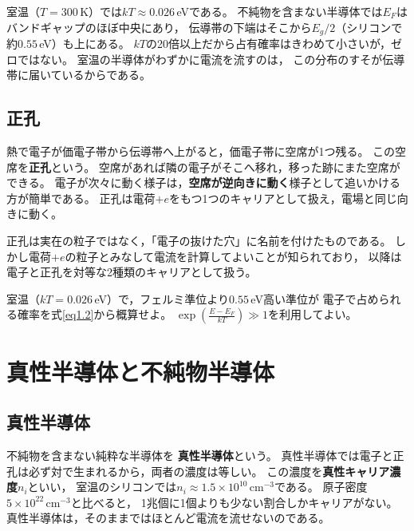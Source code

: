 室温（$T = 300$\,K）では$kT \approx 0.026$\,eVである。
不純物を含まない半導体では$E_F$はバンドギャップのほぼ中央にあり，
伝導帯の下端はそこから$E_g/2$（シリコンで約$0.55$\,eV）も上にある。
$kT$の20倍以上だから占有確率はきわめて小さいが，ゼロではない。
室温の半導体がわずかに電流を流すのは，
この分布のすそが伝導帯に届いているからである。

\subsection{正孔}

熱で電子が価電子帯から伝導帯へ上がると，価電子帯に空席が1つ残る。
この空席を\textbf{正孔}という。
空席があれば隣の電子がそこへ移れ，移った跡にまた空席ができる。
電子が次々に動く様子は，\textbf{空席が逆向きに動く}様子として追いかける方が簡単である。
正孔は電荷$+e$をもつ1つのキャリアとして扱え，電場と同じ向きに動く。

\begin{注意}
正孔は実在の粒子ではなく，「電子の抜けた穴」に名前を付けたものである。
しかし電荷$+e$の粒子とみなして電流を計算してよいことが知られており，
以降は電子と正孔を対等な2種類のキャリアとして扱う。
\end{注意}

\begin{問}
\item 室温（$kT = 0.026$\,eV）で，フェルミ準位より$0.55$\,eV高い準位が
電子で占められる確率を式\ref{eq1.2}から概算せよ。
$\exp\left(\frac{E-E_F}{kT}\right) \gg 1$を利用してよい。
\end{問}

\section{真性半導体と不純物半導体}
\label{sec1.4}

\subsection{真性半導体}

不純物を含まない純粋な半導体を
\textbf{真性半導体}という。
真性半導体では電子と正孔は必ず対で生まれるから，両者の濃度は等しい。
この濃度を\textbf{真性キャリア濃度}$n_i$といい，
室温のシリコンでは$n_i \approx 1.5\times10^{10}\,\mathrm{cm^{-3}}$である。
原子密度$5\times10^{22}\,\mathrm{cm^{-3}}$と比べると，
1兆個に1個よりも少ない割合しかキャリアがない。
真性半導体は，そのままではほとんど電流を流せないのである。

